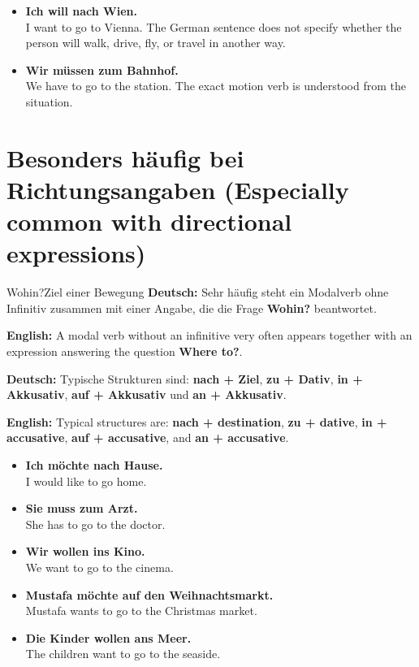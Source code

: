 \documentclass[a4paper,11pt]{article}
\newcommand{\GermanText}[1]{\textbf{Deutsch: }#1\par}
\newcommand{\EnglishText}[1]{{\small\color{SoftGray}\textbf{English: }#1\par}}
\newcommand{\ExampleItem}[2]{\item \textbf{#1}\\{\small\color{SoftGray}#2}}
\begin{document}
        \begin{exbox}
            \begin{itemize}
                \ExampleItem{Ich will nach Wien.}{I want to go to Vienna. The German sentence does not specify whether the person will walk, drive, fly, or travel in another way.}
                \ExampleItem{Wir müssen zum Bahnhof.}{We have to go to the station. The exact motion verb is understood from the situation.}
            \end{itemize}
        \end{exbox}

    \section{Besonders häufig bei Richtungsangaben \textnormal{(Especially common with directional expressions)}}

        \begin{grammarentry}{Wohin?}{Ziel einer Bewegung}
            \GermanText{Sehr häufig steht ein Modalverb ohne Infinitiv zusammen mit einer Angabe, die die Frage \textbf{Wohin?} beantwortet.}
            \EnglishText{A modal verb without an infinitive very often appears together with an expression answering the question \textbf{Where to?}.}

            \GermanText{Typische Strukturen sind: \textbf{nach + Ziel}, \textbf{zu + Dativ}, \textbf{in + Akkusativ}, \textbf{auf + Akkusativ} und \textbf{an + Akkusativ}.}
            \EnglishText{Typical structures are: \textbf{nach + destination}, \textbf{zu + dative}, \textbf{in + accusative}, \textbf{auf + accusative}, and \textbf{an + accusative}.}
        \end{grammarentry}

        \begin{exbox}
            \begin{itemize}
                \ExampleItem{Ich möchte nach Hause.}{I would like to go home.}
                \ExampleItem{Sie muss zum Arzt.}{She has to go to the doctor.}
                \ExampleItem{Wir wollen ins Kino.}{We want to go to the cinema.}
                \ExampleItem{Mustafa möchte auf den Weihnachtsmarkt.}{Mustafa wants to go to the Christmas market.}
                \ExampleItem{Die Kinder wollen ans Meer.}{The children want to go to the seaside.}
            \end{itemize}
        \end{exbox}
\end{document}

